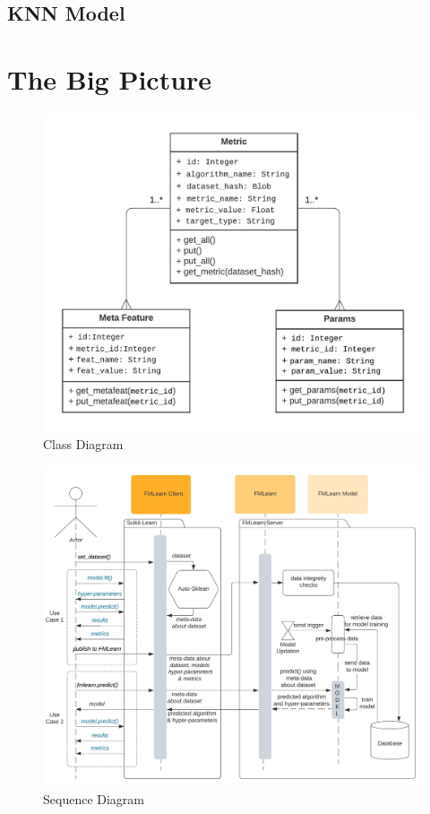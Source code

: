 \subsection{KNN Model}
\label{knn-model}

\section{The Big Picture}

\begin{figure}[H]
    \centering
    \includegraphics[width=15cm]{images/Class Diagram.jpeg}
    \caption{Class Diagram}
    \label{class-diagram}
\end{figure}

\begin{figure}[H]
    \centering
    \includegraphics[width=15cm]{images/Sequence Diagram.jpeg}
    \caption{Sequence Diagram}
    \label{sequence-diagram}
\end{figure}


